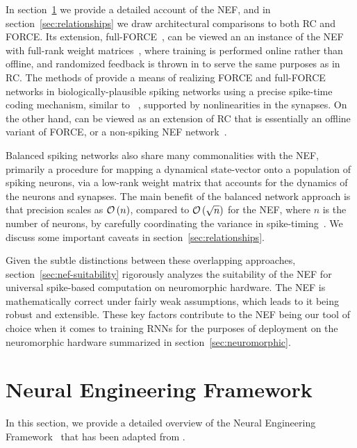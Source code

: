 In section~\ref{sec:nef} we provide a detailed account of the NEF, and in section~\ref{sec:relationships} we draw architectural comparisons to both RC and FORCE.
Its extension, full-FORCE~\citep{depasquale2018full}, can be viewed an an instance of the NEF with full-rank weight matrices~\citep{tripp2006neural}, where training is performed online rather than offline, and randomized feedback is thrown in to serve the same purposes as in RC.
The methods of \citet{thalmeier2016learning} provide a means of realizing FORCE and full-FORCE networks in biologically-plausible spiking networks using a precise spike-time coding mechanism, similar to ~\citet{boerlin2013predictive}, supported by nonlinearities in the synapses.
On the other hand, \citet{jaeger2014controlling} can be viewed as an extension of RC that is essentially an offline variant of FORCE, or a non-spiking NEF network~\citep{aubin2017}.

Balanced spiking networks also share many commonalities with the NEF, primarily a procedure for mapping a dynamical state-vector onto a population of spiking neurons, via a low-rank weight matrix that accounts for the dynamics of the neurons and synapses.
The main benefit of the balanced network approach is that precision scales as $\mathcal{O}\left({n}\right)$, compared to $\mathcal{O}\left({\sqrt{n}}\right)$ for the NEF, where $n$ is the number of neurons, by carefully coordinating the variance in spike-timing~\citep[][Figure~11]{boahen2017neuromorph}.
We discuss some important caveats in section~\ref{sec:relationships}.

Given the subtle distinctions between these overlapping approaches,
section~\ref{sec:nef-suitability} rigorously analyzes the suitability of the NEF for universal spike-based computation on neuromorphic hardware.
The NEF is mathematically correct under fairly weak assumptions, which leads to it being robust and extensible.
These key factors contribute to the NEF being our tool of choice when it comes to training RNNs for the purposes of deployment on the neuromorphic hardware summarized in section~\ref{sec:neuromorphic}.

\section{Neural Engineering Framework}
\label{sec:nef}

In this section, we provide a detailed overview of the Neural Engineering Framework~\citep[NEF;][]{eliasmith2003a} that has been adapted from \citet{voelker2018}.

